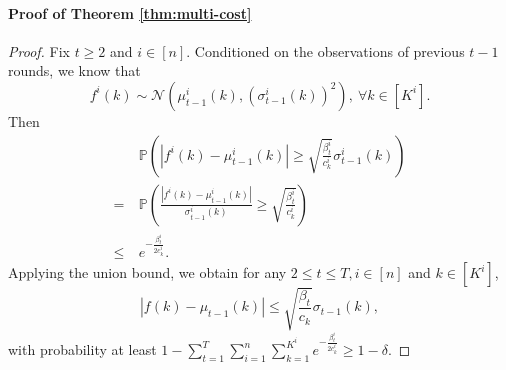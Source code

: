 \documentclass[letterpaper]{vldb}
\newcommand{\cN}{\mathcal{N}}
\newcommand{\bP}{\mathbb{P}} %
\begin{document}
\paragraph*{Proof of Theorem \ref{thm:multi-cost}}
\begin{proof}
  Fix $t\ge 2$ and $i\in [n]$. Conditioned on the observations of previous $t-1$ rounds, we
  know that 
  \[
    f^i(k) \sim \cN(\mu^i_{t-1}(k), (\sigma^i_{t-1}(k))^2), \ \forall k\in [K^i].
  \]
  Then
  \begin{align*}
    & \bP\left(|f^i(k)- \mu^i_{t-1}(k)| \ge \sqrt{\frac{\beta^i_t}{c^i_k}}\sigma^i_{t-1}(k)\right)\\
    =\ & \bP\left(\frac{|f^i(k)- \mu^i_{t-1}(k)|}{\sigma^i_{t-1}(k)} \ge \sqrt{\frac{\beta^i_t}{c^i_k}}\right)\\
    \le\ & e^{-\frac{\beta^i_t}{2c^i_k}}.
  \end{align*}
  Applying the union bound, we obtain for any $2\le t\le T, i\in [n]$ and $k\in [K^i]$,
  \[
    |f(k) - \mu_{t-1}(k) | \le \sqrt{\frac{\beta_t}{c_k}}\sigma_{t-1}(k),
  \]
  with probability at least $1- \sum_{t=1}^T\sum_{i=1}^n\sum_{k=1}^{K^i}
  e^{-\frac{\beta^i_t}{2c^i_k}} \ge  1 - \delta$.
 

\end{proof}
\end{document}
